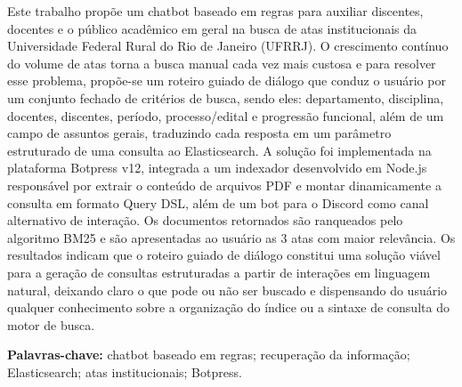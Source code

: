 \renewcommand{\abstractname}{Resumo}

Este trabalho propõe um chatbot baseado em regras para auxiliar discentes, docentes
e o público acadêmico em geral na busca de atas institucionais da Universidade
Federal Rural do Rio de Janeiro (UFRRJ). O crescimento contínuo do volume de
atas torna a busca manual cada vez mais custosa e para resolver esse problema,
propõe-se um roteiro guiado de diálogo que conduz o usuário por um conjunto fechado
de critérios de busca, sendo eles: departamento, disciplina, docentes, discentes, período,
processo/edital e progressão funcional, além de um campo de assuntos gerais,
traduzindo cada resposta em um parâmetro estruturado de uma consulta ao
Elasticsearch. A solução foi implementada na plataforma Botpress v12, integrada
a um indexador desenvolvido em Node.js responsável por extrair o conteúdo de
arquivos PDF e montar dinamicamente a consulta em formato Query DSL, além de um bot para o Discord como canal alternativo de interação. Os documentos
retornados são ranqueados pelo algoritmo BM25 e são apresentadas ao usuário as 3 atas com maior relevância. Os resultados indicam que o roteiro guiado de diálogo constitui uma solução
viável para a geração de consultas estruturadas a partir de interações em linguagem
natural, deixando claro o que pode ou não ser buscado e dispensando
do usuário qualquer conhecimento sobre a organização do índice ou a sintaxe de
consulta do motor de busca.

\textbf{Palavras-chave:} chatbot baseado em regras; recuperação da informação;
Elasticsearch; atas institucionais; Botpress.

